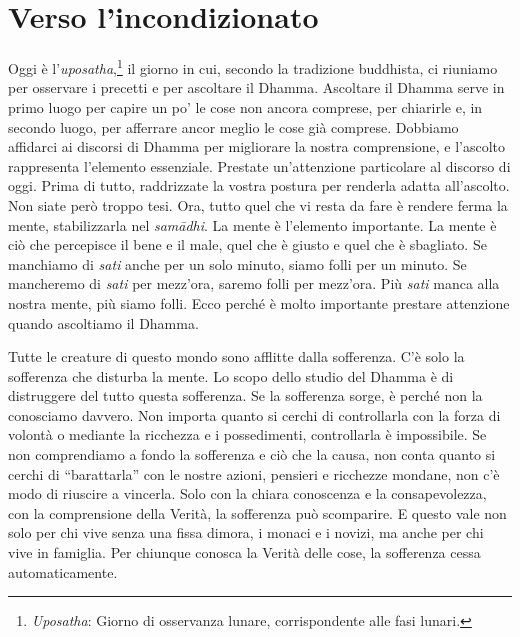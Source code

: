\chapter{Verso l'incondizionato}

Oggi è l'\emph{uposatha},\footnote{\emph{Uposatha}: Giorno di osservanza
  lunare, corrispondente alle fasi lunari.} il giorno in cui, secondo la
tradizione buddhista, ci riuniamo per osservare i precetti e per
ascoltare il Dhamma. Ascoltare il Dhamma serve in primo luogo per capire
un po' le cose non ancora comprese, per chiarirle e, in secondo luogo,
per afferrare ancor meglio le cose già comprese. Dobbiamo affidarci ai
discorsi di Dhamma per migliorare la nostra comprensione, e l'ascolto
rappresenta l'elemento essenziale. Prestate un'attenzione particolare al
discorso di oggi. Prima di tutto, raddrizzate la vostra postura per
renderla adatta all'ascolto. Non siate però troppo tesi. Ora, tutto quel
che vi resta da fare è rendere ferma la mente, stabilizzarla nel
\emph{samādhi}. La mente è l'elemento importante. La mente è ciò che
percepisce il bene e il male, quel che è giusto e quel che è sbagliato.
Se manchiamo di \emph{sati} anche per un solo minuto, siamo folli per un
minuto. Se mancheremo di \emph{sati} per mezz'ora, saremo folli per
mezz'ora. Più \emph{sati} manca alla nostra mente, più siamo folli. Ecco
perché è molto importante prestare attenzione quando ascoltiamo il
Dhamma.

Tutte le creature di questo mondo sono afflitte dalla sofferenza. C'è
solo la sofferenza che disturba la mente. Lo scopo dello studio del
Dhamma è di distruggere del tutto questa sofferenza. Se la sofferenza
sorge, è perché non la conosciamo davvero. Non importa quanto si cerchi
di controllarla con la forza di volontà o mediante la ricchezza e i
possedimenti, controllarla è impossibile. Se non comprendiamo a fondo la
sofferenza e ciò che la causa, non conta quanto si cerchi di
``barattarla'' con le nostre azioni, pensieri e ricchezze mondane, non
c'è modo di riuscire a vincerla. Solo con la chiara conoscenza e la
consapevolezza, con la comprensione della Verità, la sofferenza può
scomparire. E questo vale non solo per chi vive senza una fissa dimora,
i monaci e i novizi, ma anche per chi vive in famiglia. Per chiunque
conosca la Verità delle cose, la sofferenza cessa automaticamente.


